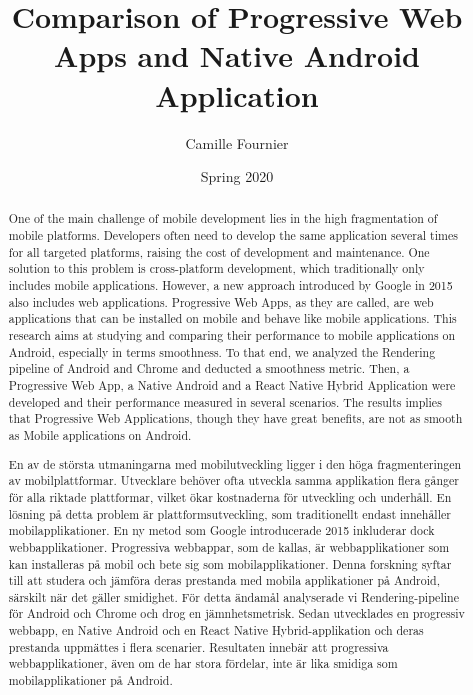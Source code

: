 \documentclass{kththesis}
\title{Comparison of Progressive Web Apps and Native Android Application}
\author{Camille Fournier}
\date{Spring 2020}
\begin{document}
\sloppy %


\frontmatter
{}

\titlepage

\begin{abstract}    
  One of the main challenge of mobile development lies in the high fragmentation of mobile platforms. Developers often need to develop the same application several times for all targeted platforms, raising the cost of development and maintenance. One solution to this problem is cross-platform development, which traditionally only includes mobile applications. However, a new approach introduced by Google in 2015 also includes web applications. Progressive Web Apps, as they are called, are web applications that can be installed on mobile and behave like mobile applications. This research aims at studying and comparing their performance to mobile applications on Android, especially in terms smoothness. To that end, we analyzed the Rendering pipeline of Android and Chrome and deducted a smoothness metric. Then, a Progressive Web App, a Native Android and a React Native Hybrid Application were developed and their performance measured in several scenarios. The results implies that Progressive Web Applications, though they have great benefits, are not as smooth as Mobile applications on Android.
\end{abstract}


\begin{otherlanguage}{swedish}
  \begin{abstract}
    En av de största utmaningarna med mobilutveckling ligger i den höga fragmenteringen av mobilplattformar. Utvecklare behöver ofta utveckla samma applikation flera gånger för alla riktade plattformar, vilket ökar kostnaderna för utveckling och underhåll. En lösning på detta problem är plattformsutveckling, som traditionellt endast innehåller mobilapplikationer. En ny metod som Google introducerade 2015 inkluderar dock webbapplikationer. Progressiva webbappar, som de kallas, är webbapplikationer som kan installeras på mobil och bete sig som mobilapplikationer. Denna forskning syftar till att studera och jämföra deras prestanda med mobila applikationer på Android, särskilt när det gäller smidighet. För detta ändamål analyserade vi Rendering-pipeline för Android och Chrome och drog en jämnhetsmetrisk. Sedan utvecklades en progressiv webbapp, en Native Android och en React Native Hybrid-applikation och deras prestanda uppmättes i flera scenarier. Resultaten innebär att progressiva webbapplikationer, även om de har stora fördelar, inte är lika smidiga som mobilapplikationer på Android.
  \end{abstract}
\end{otherlanguage}
\end{document}
